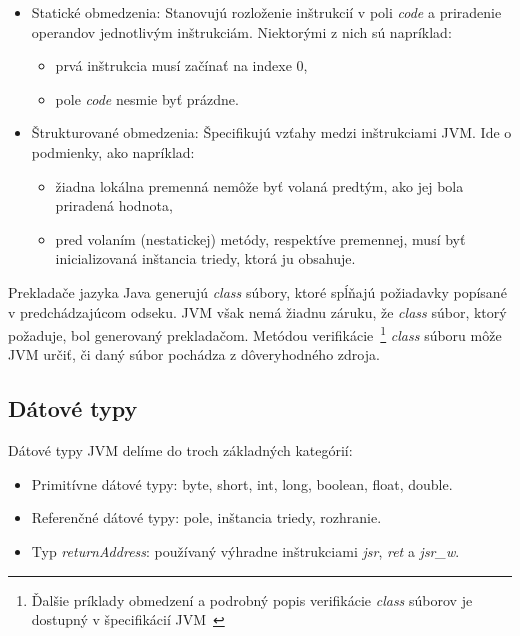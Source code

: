 \documentclass[11pt,final,oneside]{fithesis}
\begin{document}
\begin{itemize}
\item Statické obmedzenia: Stanovujú rozloženie inštrukcií v poli \textit{code}
a priradenie operandov jednotlivým inštrukciám. Niektorými z nich sú napríklad:

\begin{itemize}
\item prvá inštrukcia musí začínať na indexe 0,
\item pole \textit{code} nesmie byť prázdne.
\end{itemize}

\item Štrukturované obmedzenia: Špecifikujú vzťahy medzi inštrukciami JVM. Ide
o podmienky, ako napríklad:

\begin{itemize}
\item žiadna lokálna premenná nemôže byť volaná predtým, ako jej bola priradená
hodnota,
\item pred volaním (nestatickej) metódy, respektíve premennej, musí byť
inicializovaná inštancia triedy, ktorá ju obsahuje.
\end{itemize}

\end{itemize}

Prekladače jazyka Java generujú \textit{class} súbory, ktoré spĺňajú požiadavky
popísané v predchádzajúcom odseku. JVM však nemá žiadnu záruku, že
\textit{class} súbor, ktorý požaduje, bol generovaný prekladačom. Metódou
verifikácie~\footnote{Ďalšie príklady obmedzení a podrobný popis verifikácie
\textit{class} súborov je dostupný v špecifikácií
JVM~\cite{Lindholm:2013:JVM:2462629}} \textit{class} súboru môže JVM určiť, či
daný súbor pochádza z dôveryhodného zdroja.

\subsection{Dátové typy}
Dátové typy JVM delíme do troch základných
kategórií:

\begin{itemize}
\item Primitívne dátové typy: byte, short, int, long, boolean, float, double.
\item Referenčné dátové typy: pole, inštancia triedy, rozhranie.
\item Typ \textit{returnAddress}: používaný výhradne inštrukciami
\textit{jsr}, \textit{ret} a \textit{jsr\_w}.
\end{itemize}
\end{document}
